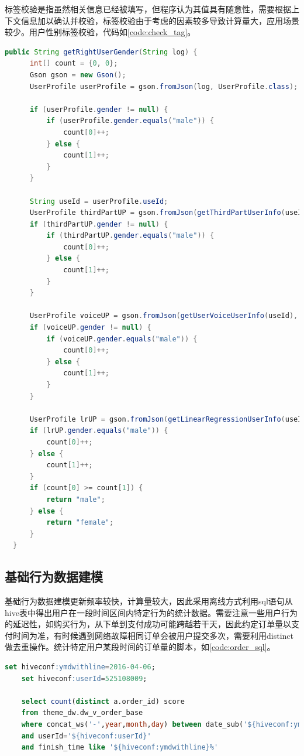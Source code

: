   标签校验是指虽然相关信息已经被填写，但程序认为其值具有随意性，需要根据上下文信息加以确认并校验，标签校验由于考虑的因素较多导致计算量大，应用场景较少。用户性别标签校验，代码如\autoref{code:check_tag}。
  \begin{lstlisting}[language=java,firstnumber=1,label={code:check_tag}, caption={标签校验算法}]
      public String getRightUserGender(String log) {
      int[] count = {0, 0};
      Gson gson = new Gson();
      UserProfile userProfile = gson.fromJson(log, UserProfile.class);

      if (userProfile.gender != null) {
          if (userProfile.gender.equals("male")) {
              count[0]++;
          } else {
              count[1]++;
          }
      }

      String useId = userProfile.useId;
      UserProfile thirdPartUP = gson.fromJson(getThirdPartUserInfo(useId), UserProfile.class);
      if (thirdPartUP.gender != null) {
          if (thirdPartUP.gender.equals("male")) {
              count[0]++;
          } else {
              count[1]++;
          }
      }

      UserProfile voiceUP = gson.fromJson(getUserVoiceUserInfo(useId), UserProfile.class);
      if (voiceUP.gender != null) {
          if (voiceUP.gender.equals("male")) {
              count[0]++;
          } else {
              count[1]++;
          }
      }

      UserProfile lrUP = gson.fromJson(getLinearRegressionUserInfo(useId), UserProfile.class);
      if (lrUP.gender.equals("male")) {
          count[0]++;
      } else {
          count[1]++;
      }
      if (count[0] >= count[1]) {
          return "male";
      } else {
          return "female";
      }
  }
  \end{lstlisting}

  \subsection{基础行为数据建模}
  基础行为数据建模更新频率较快，计算量较大，因此采用离线方式利用sql语句从hive表中得出用户在一段时间区间内特定行为的统计数据。需要注意一些用户行为的延迟性，如购买行为，从下单到支付成功可能跨越若干天，因此约定订单量以支付时间为准，有时候遇到网络故障相同订单会被用户提交多次，需要利用distinct做去重操作。统计特定用户某段时间的订单量的脚本，如\autoref{code:order_sql}。
  \begin{lstlisting}[language=SQL,firstnumber=1,label={code:order_sql}, caption={基础行为数据建模脚本}]
    set hiveconf:ymdwithline=2016-04-06;
    set hiveconf:userId=525108009;

    select count(distinct a.order_id) score
    from theme_dw.dw_v_order_base
    where concat_ws('-',year,month,day) between date_sub('${hiveconf:ymdwithline}',5) and '${hiveconf:ymdwithline}'
    and userId='${hiveconf:userId}'
    and finish_time like '${hiveconf:ymdwithline}%'
  \end{lstlisting}

